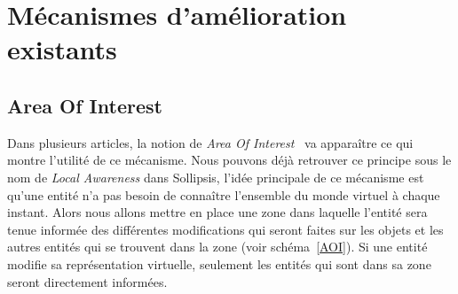 \section{Mécanismes d'amélioration existants}
	\subsection{Area Of Interest}
	Dans plusieurs articles, la notion de \textit{Area Of Interest}~\cite{1403002,1267692,1015507} va apparaître ce qui montre l'utilité de ce mécanisme. Nous pouvons déjà retrouver ce principe sous le nom de \textit{Local Awareness} dans Sollipsis, l'idée principale de ce mécanisme est qu'une entité n'a pas besoin de connaître l'ensemble du monde virtuel à chaque instant. Alors nous allons mettre en place une zone dans laquelle l'entité sera tenue informée des différentes modifications qui seront faites sur les objets et les autres entités qui se trouvent dans la zone (voir schéma~\ref{AOI}). Si une entité modifie sa représentation virtuelle, seulement les entités qui sont dans sa zone seront directement informées.\\

